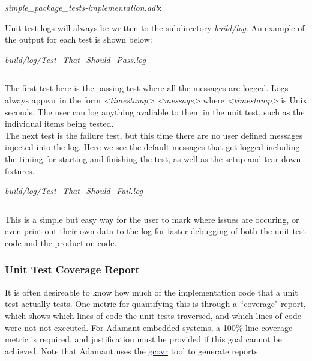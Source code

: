 \textit{simple\_package\_tests-implementation.adb}:


Unit test logs will always be written to the subdirectory \textit{build/log}. An example of the output for each test is shown below:

\vspace{5mm} %
\textit{build/log/Test\_That\_Should\_Pass.log}
\inputminted{text}{../example_architecture/simple_package/test_better4/build/log/Test_That_Should_Pass.log}
\vspace{5mm} %

The first test here is the passing test where all the messages are logged. Logs always appear in the form \textit{<timestamp> <message>} where \textit{<timestamp>} is Unix seconds. The user can log anything avaliable to them in the unit test, such as the individual items being tested. \\

The next test is the failure test, but this time there are no user defined messages injected into the log. Here we see the default messages that get logged including the timing for starting and finishing the test, as well as the setup and tear down fixtures.

\vspace{5mm} %
\textit{build/log/Test\_That\_Should\_Fail.log}
\inputminted{text}{../example_architecture/simple_package/test_better4/build/log/Test_That_Should_Fail.log}
\vspace{5mm} %

This is a simple but easy way for the user to mark where issues are occuring, or even print out their own data to the log for faster debugging of both the unit test code and the production code.

\subsubsection{Unit Test Coverage Report} \label{Unit Test Coverage Report}

It is often desireable to know how much of the implementation code that a unit test actually tests. One metric for quantifying this is through a ``coverage" report, which shows which lines of code the unit tests traversed, and which lines of code were not not executed. For Adamant embedded systems, a 100\% line coverage metric is required, and justification must be provided if this goal cannot be achieved. Note that Adamant uses the \href{https://gcovr.com/en/stable/}{\textcolor{blue}{gcovr}} tool to generate reports. \\


